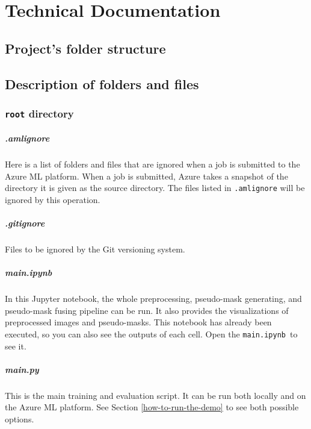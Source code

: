\chapter{Technical Documentation \label{appendix:td} }
\renewcommand{\thepage}{B-\arabic{page}}
\setcounter{page}{1}

\section{Project's folder structure}
\label{projects-folder-structure}



\section{Description of folders and
files}\label{description-of-folders-and-files}

\subsection{\texttt{root} directory}\label{root-directory-files}

\paragraph{.amlignore}
Here is a list of folders and files that are ignored when a job is
submitted to the Azure ML platform. When a job is submitted, Azure takes
a snapshot of the directory it is given as the source directory. The
files listed in \texttt{.amlignore} will be ignored by this operation.

\paragraph{.gitignore}
Files to be ignored by the Git versioning system.

\paragraph{main.ipynb}
In this Jupyter notebook, the whole preprocessing, pseudo-mask generating, and pseudo-mask fusing pipeline can be run. It also provides
the visualizations of preprocessed images and pseudo-masks. This notebook has already been executed, so you can also see the outputs of each cell. Open
the \texttt{main.ipynb }to see it.

\paragraph{main.py}
This is the main training and evaluation script. It can be run both
locally and on the Azure ML platform. See Section \ref{how-to-run-the-demo} to see both possible
options.

